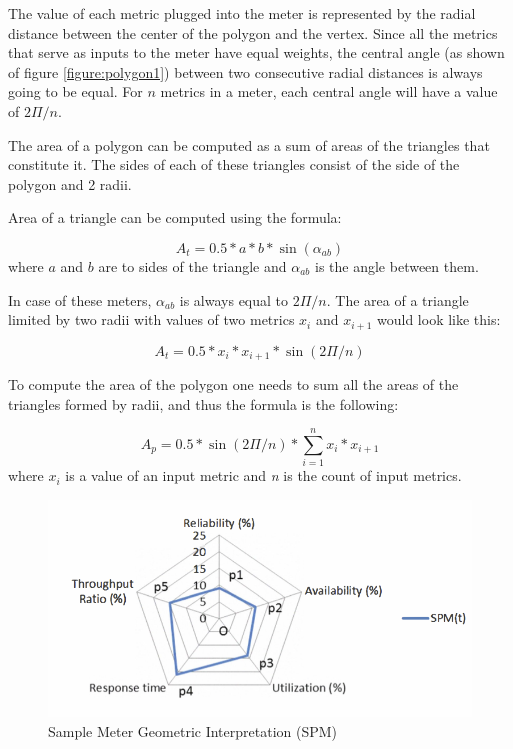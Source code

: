 \documentclass{uvamscse}
\begin{document}
The value of each metric plugged into the meter is represented by the radial distance between the center of the polygon and the vertex. Since all the metrics that serve as inputs to the meter have equal weights, the central angle (as shown of figure \ref{figure:polygon1}) between two consecutive radial distances is always going to be equal. For \textit{$n$} metrics in a meter, each central angle will have a value of \textit{$2\Pi/n$}.

The area of a polygon can be computed as a sum of areas of the triangles that constitute it. The sides of each of these triangles consist of the side of the polygon and 2 radii.

Area of a triangle can be computed using the formula:
\begin{center}
  $$A_t = 0.5 * a*b * \sin(\alpha_{ab}) $$
  where \textit{$a$} and \textit{$b$} are to sides of the triangle and $\alpha_{ab}$ is the angle between them.
\end{center}

In case of these meters, $\alpha_{ab}$ is always equal to $2\Pi/n$. The area of a triangle limited by two radii with values of two metrics $x_i$ and $x_{i+1}$ would look like this:
\begin{center}
  $$A_t = 0.5 * x_i*x_{i+1} * \sin(2\Pi/n) $$
\end{center}

To compute the area of the polygon one needs to sum all the areas of the triangles formed by radii, and thus the formula is the following:
\begin{center}
  \texttt{$$A_p = 0.5 * \sin(2\Pi/n) * \sum_{i=1}^{n}x_i*x_{i+1}$$}
  where \textit{$x_i$} is a value of an input metric and \textit{n} is the count of input metrics.
\end{center}

\begin{figure}[h]
\centering
\includegraphics[scale=0.5]{polygon}
\caption{Sample Meter Geometric Interpretation (SPM)}
\label{figure:polygon}
\end{figure}
\end{document}
